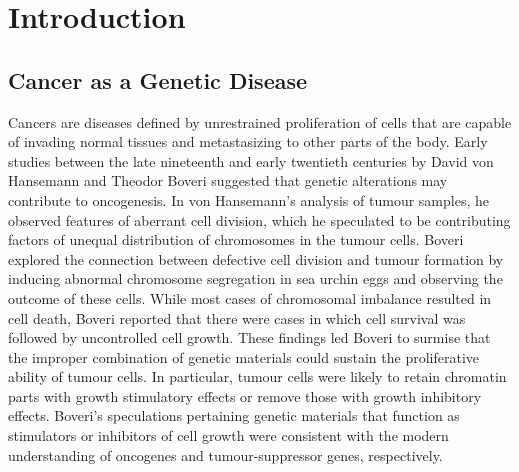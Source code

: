 
\chapter{Introduction}
\label{ch:Introduction}

\section{Cancer as a Genetic Disease}
\label{sec:CancerasaGeneticDisease}

Cancers are diseases defined by unrestrained proliferation of cells that are capable of invading normal tissues and metastasizing to other parts of the body. Early studies between the late nineteenth and early twentieth centuries by David von Hansemann and Theodor Boveri suggested that genetic alterations may contribute to oncogenesis. In von Hansemann's analysis of tumour samples, he observed features of aberrant cell division, which he speculated to be contributing factors of unequal distribution of chromosomes in the tumour cells. Boveri explored the connection between defective cell division and tumour formation by inducing abnormal chromosome segregation in sea urchin eggs and observing the outcome of these cells. While most cases of chromosomal imbalance resulted in cell death, Boveri reported that there were cases in which cell survival was followed by uncontrolled cell growth. These findings led Boveri to surmise that the improper combination of genetic materials could sustain the proliferative ability of tumour cells. In particular, tumour cells were likely to retain chromatin parts with growth stimulatory effects or remove those with growth inhibitory effects. Boveri's speculations pertaining genetic materials that function as stimulators or inhibitors of cell growth were consistent with the modern understanding of oncogenes and tumour-suppressor genes, respectively.


